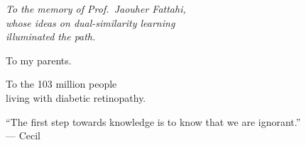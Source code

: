 \thispagestyle{empty}
\null\vspace{5cm}
\begin{center}
\itshape
To the memory of Prof.\ Jaouher Fattahi,\\
whose ideas on dual-similarity learning\\
illuminated the path.

\vspace{1.2cm}
To my parents.

\vspace{1.2cm}
To the 103 million people\\
living with diabetic retinopathy.

\vspace{2.2cm}
\upshape\small
``The first step towards knowledge is to know that we are ignorant.''\\[3pt]
--- Cecil
\end{center}
\clearpage
